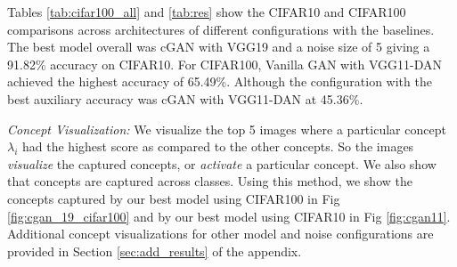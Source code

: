 \documentclass[letterpaper]{article}
\begin{document}
\begin{table}[h!]
\centering
{}
\caption{\textit{Accuracy} (in \%) and \textit{Auxiliary Accuracy} (in \%) for comparison with the baseline and SENN on CIFAR10. cGAN = Conditional GAN, B = Batch Size, S = size of noise. We see that our method classifies better.}
\label{tab:res}
\end{table}

Tables \ref{tab:cifar100_all} and \ref{tab:res} show the CIFAR10 and CIFAR100 comparisons across architectures of different configurations with the baselines. The best model overall was cGAN with VGG19 and a noise size of 5 giving a 91.82\% accuracy on CIFAR10. For CIFAR100, Vanilla GAN with VGG11-DAN achieved the highest accuracy of 65.49\%. Although the configuration with the best auxiliary accuracy was cGAN with VGG11-DAN at 45.36\%.




\textit{Concept Visualization:} We visualize the top 5 images where a particular concept $\lambda_i$ had the highest score as compared to the other concepts. So
the images \textit{visualize} the captured concepts, or \textit{activate} a particular concept. We also show that concepts are captured across classes. Using this method, we show the concepts captured by our best model using CIFAR100 in Fig \ref{fig:cgan_19_cifar100} and by our best model using CIFAR10 in Fig \ref{fig:cgan11}. %
Additional concept visualizations for other model and noise configurations are provided in Section \ref{sec:add_results} of the appendix.
\end{document}
